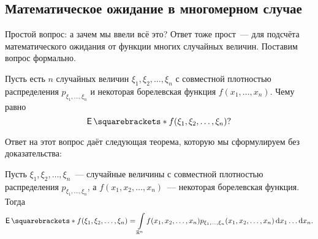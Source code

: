 \subsection{Математическое ожидание в многомерном случае}
Простой вопрос: а зачем мы ввели всё это? Ответ тоже прост~--- для подсчёта математического ожидания от функции многих случайных величин. Поставим вопрос формально.
\begin{problem}
	Пусть есть \(n\) случайных величин \(\xi_1, \xi_2, \dots, \xi_n\) с совместной плотностью распределения \(p_{\xi_1, \dots, \xi_n}\) и некоторая борелевская функция \(f(x_1, \dots, x_n)\). Чему равно
	\[
	\E{f(\xi_1, \xi_2, \dots, \xi_n)}?
	\]
\end{problem}
Ответ на этот вопрос даёт следующая теорема, которую мы сформулируем без доказательства:
\begin{theorem}
	Пусть \(\xi_1, \xi_2, \dots, \xi_n\)~--- случайные величины с совместной плотностью распределения \(p_{\xi_1, \dots, \xi_n}\), а \(f(x_1, x_2, \dots, x_n)\)~--- некоторая борелевская функция. Тогда
	\[
	\E{f(\xi_1, \xi_2, \dots, \xi_n)} = \int\limits_{\R^n} f(x_1, x_2, \dots, x_n)p_{\xi_1, \dots, \xi_n}(x_1, x_2, \dots, x_n)\,\mathrm{d}x_1\dots\mathrm{d}x_n.
	\]
\end{theorem}

